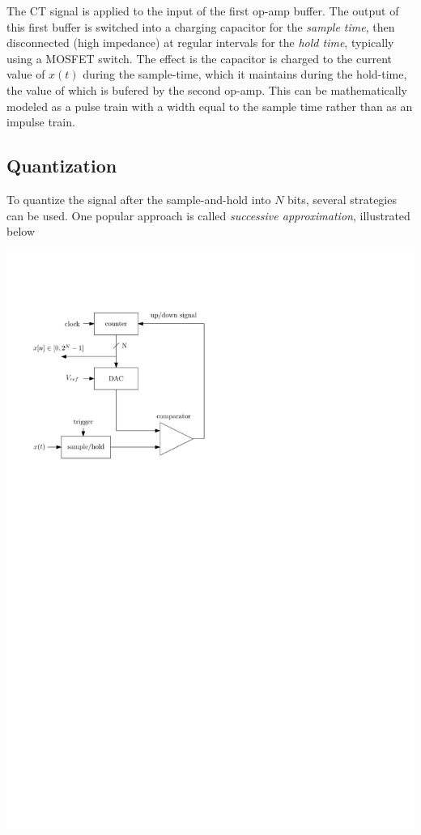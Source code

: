 The CT signal is applied to the input of the first op-amp buffer. The output of this first buffer is switched into a charging capacitor for the \emph{sample time}, then disconnected (high impedance) at regular intervals for the \emph{hold time}, typically using a MOSFET switch. The effect is the capacitor is charged to the current value of $x(t)$ during the sample-time, which it maintains during the hold-time, the value of which is bufered by the second op-amp. This can be mathematically modeled as a pulse train with a width equal to the sample time rather than as an impulse train.

\subsection{Quantization}

To quantize the signal after the sample-and-hold into $N$ bits, several strategies can be used. One popular approach is called \emph{successive approximation}, illustrated below

\begin{center}
  \includegraphics[scale=1]{graphics/sar.pdf}
\end{center}

